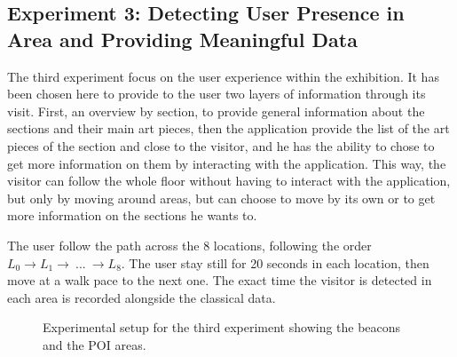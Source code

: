 \subsection{Experiment 3: Detecting User Presence in Area and Providing Meaningful Data}

The third experiment focus on the user experience within the exhibition. It has been chosen here to provide to the user two layers of information through its visit. First, an overview by section, to provide general information about the sections and their main art pieces, then the application provide the list of the art pieces of the section and close to the visitor, and he has the ability to chose to get more information on them by interacting with the application. This way, the visitor can follow the whole floor without having to interact with the application, but only by moving around areas, but can choose to move by its own or to get more information on the sections he wants to.

The user follow the path across the 8 locations, following the order $L_0 \rightarrow L_1 \rightarrow~...~\rightarrow L_8$. The user stay still for 20 seconds in each location, then move at a walk pace to the next one. The exact time the visitor is detected in each area is recorded alongside the classical data.


\begin{figure}[H]
    \centering
    \caption{Experimental setup for the third experiment showing the beacons and the POI areas.}
    \label{fig:exp3_poi}
\end{figure}

